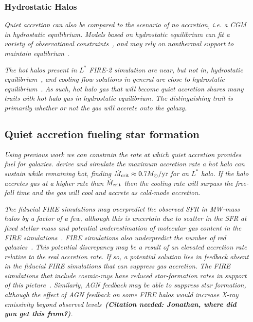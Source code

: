 \documentclass[fleqn,usenatbib]{mnras}
\begin{document}
\subsubsection{Hydrostatic Halos}
\label{s: modes -- hydrostatic}

\textit{
Quiet accretion can also be compared to the scenario of no accretion, i.e. a CGM in hydrostatic equilibrium.
Models based on hydrostatic equilibrium can fit a variety of observational constraints~\citep[e.g.][]{Faerman2017, Krause2019}, and may rely on nonthermal support to maintain equlibrium~\citep[e.g.][]{Faerman2019}.
}

\textit{
The hot halos present in $L^*$ FIRE-2 simulation are near, but not in, hydrostatic equilibrium~\citep{Esmerian2020, Stern2020}, and cooling flow solutions in general are close to hydrostatic equilibrium~\citep{Stern2019}.
As such, hot halo gas that will become quiet accretion shares many traits with hot halo gas in hydrostatic equilibrium.
The distinguishing trait is primarily whether or not the gas will accrete onto the galaxy.
}

\subsection{Quiet accretion fueling star formation}
\label{s: fueling}

\textit{
Using previous work we can constrain the rate at which quiet accretion provides fuel for galaxies.
\cite{Stern2020a} derive and simulate the maximum accretion rate a hot halo can sustain while remaining hot, finding $\dot M_{\rm crit} \approx 0.7 M_\odot/{\rm yr}$ for an $L^*$ halo.
If the halo accretes gas at a higher rate than $\dot M_{\rm crit}$ then the cooling rate will surpass the free-fall time and the gas will cool and accrete as cold-mode accretion.
}

\textit{
The fiducial FIRE simulations may overpredict the observed SFR in MW-mass halos by a factor of a few, although this is uncertain due to scatter in the SFR at fixed stellar mass and potential underestimation of molecular gas content in the FIRE simulations~\citep{Sparre2017, Orr2018}.
FIRE simulations also underpredict the number of red galaxies~\citep{Garrison-Kimmel2017}.
This potential discrepancy may be a result of an elevated accretion rate relative to the real accretion rate.
If so, a potential solution lies in feedback absent in the fiducial FIRE simulations that can suppress gas accretion.
The FIRE simulations that include cosmic-rays have reduced star-formation rates in support of this picture~\citep{Chan2019, Hopkins2020, Hopkins2020a, Hopkins2020b}.
Similarly, AGN feedback may be able to suppress star formation, although the effect of AGN feedback on some FIRE halos would increase X-ray emissivity beyond observed levels~\textbf{(Citation needed: Jonathan, where did you get this from?)}. 
}
\end{document}

